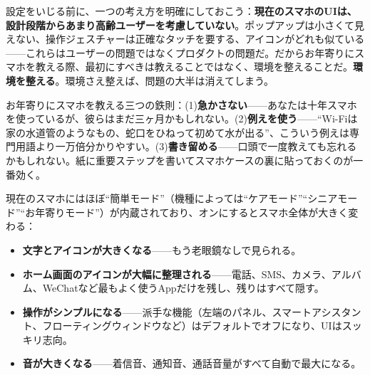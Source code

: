 


設定をいじる前に、一つの考え方を明確にしておこう：\textbf{現在のスマホのUIは、設計段階からあまり高齢ユーザーを考慮していない}。ポップアップは小さくて見えない、操作ジェスチャーは正確なタッチを要する、アイコンがどれも似ている——これらはユーザーの問題ではなくプロダクトの問題だ。だからお年寄りにスマホを教える際、最初にすべきは教えることではなく、環境を整えることだ。\textbf{環境を整える}。環境さえ整えば、問題の大半は消えてしまう。

お年寄りにスマホを教える三つの鉄則：(1)\textbf{急かさない}——あなたは十年スマホを使っているが、彼らはまだ三ヶ月かもしれない。(2)\textbf{例えを使う}——“Wi-Fiは家の水道管のようなもの、蛇口をひねって初めて水が出る”、こういう例えは専門用語より一万倍分かりやすい。(3)\textbf{書き留める}——口頭で一度教えても忘れるかもしれない。紙に重要ステップを書いてスマホケースの裏に貼っておくのが一番効く。


現在のスマホにはほぼ“簡単モード”（機種によっては“ケアモード”“シニアモード”“お年寄りモード”）が内蔵されており、オンにするとスマホ全体が大きく変わる：

\begin{itemize}
  \item \textbf{文字とアイコンが大きくなる}——もう老眼鏡なしで見られる。
  \item \textbf{ホーム画面のアイコンが大幅に整理される}——電話、SMS、カメラ、アルバム、WeChatなど最もよく使うAppだけを残し、残りはすべて隠す。
  \item \textbf{操作がシンプルになる}——派手な機能（左端のパネル、スマートアシスタント、フローティングウィンドウなど）はデフォルトでオフになり、UIはスッキリ志向。
  \item \textbf{音が大きくなる}——着信音、通知音、通話音量がすべて自動で最大になる。
\end{itemize}

